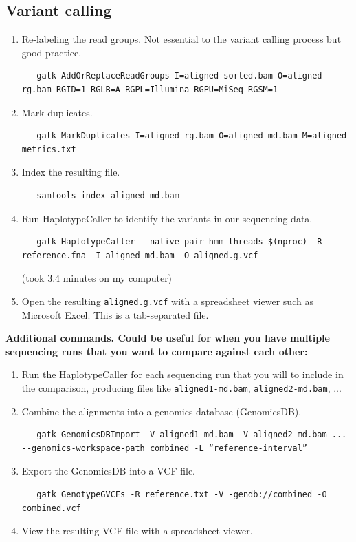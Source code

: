 \documentclass[12pt,letterpaper]{article}
\begin{document}
\subsection{Variant calling}

\begin{enumerate}
   \item Re-labeling the read groups. Not essential to the variant calling process but good practice.  \begin{verbatim}
   gatk AddOrReplaceReadGroups I=aligned-sorted.bam O=aligned-rg.bam RGID=1 RGLB=A RGPL=Illumina RGPU=MiSeq RGSM=1
   \end{verbatim}
   \item Mark duplicates. \begin{verbatim}
   gatk MarkDuplicates I=aligned-rg.bam O=aligned-md.bam M=aligned-metrics.txt
   \end{verbatim}
   \item Index the resulting file. \begin{verbatim}
   samtools index aligned-md.bam
   \end{verbatim}
   \item Run HaplotypeCaller to identify the variants in our sequencing data. \begin{verbatim}
   gatk HaplotypeCaller --native-pair-hmm-threads $(nproc) -R reference.fna -I aligned-md.bam -O aligned.g.vcf
   \end{verbatim}
   (took 3.4 minutes on my computer)
   \item Open the resulting \texttt{aligned.g.vcf} with a spreadsheet viewer such as Microsoft Excel. This is a tab-separated file.
\end{enumerate}


\textbf{Additional commands. Could be useful for when you have multiple sequencing runs that you want to compare against each other:}

\begin{enumerate}
   \item Run the HaplotypeCaller for each sequencing run that you will to include in the comparison, producing files like \texttt{aligned1-md.bam}, \texttt{aligned2-md.bam}, ...
   \item Combine the alignments into a genomics database (GenomicsDB). \begin{verbatim}
   gatk GenomicsDBImport -V aligned1-md.bam -V aligned2-md.bam ... --genomics-workspace-path combined -L “reference-interval”
   \end{verbatim}
   \item Export the GenomicsDB into a VCF file. \begin{verbatim}
   gatk GenotypeGVCFs -R reference.txt -V -gendb://combined -O combined.vcf
   \end{verbatim}
   \item View the resulting VCF file with a spreadsheet viewer.
\end{enumerate}
\end{document}
